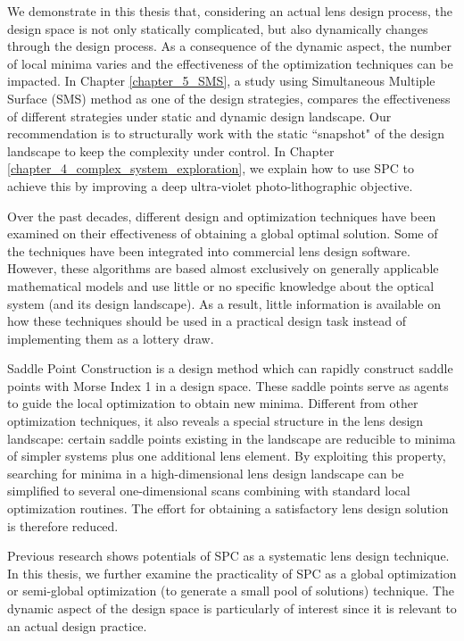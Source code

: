 We demonstrate in this thesis that, considering an actual lens design process, the design space is not only statically complicated, but also dynamically changes through the design process. As a consequence of the dynamic aspect, the number of local minima varies and the effectiveness of the optimization techniques can be impacted. In Chapter \ref{chapter_5_SMS}, a study using Simultaneous Multiple Surface (SMS) method as one of the design strategies, compares the effectiveness of different strategies under static and dynamic design landscape. Our recommendation is to structurally work with the static “snapshot" of the design landscape to keep the complexity under control. In Chapter \ref{chapter_4_complex_system_exploration}, we explain how to use SPC to achieve this by improving a deep ultra-violet photo-lithographic objective.

Over the past decades, different design and optimization techniques have been examined on their effectiveness of obtaining a global optimal solution. Some of the techniques have been integrated into commercial lens design software. However, these algorithms are based almost exclusively on generally applicable mathematical models and use little or no specific knowledge about the optical system (and its design landscape). As a result, little information is available on how these techniques should be used in a practical design task instead of implementing them as a lottery draw. 

Saddle Point Construction is a design method which can rapidly construct saddle points with Morse Index 1 in a design space. These saddle points serve as agents to guide the local optimization to obtain new minima. Different from other optimization techniques, it also reveals a special structure in the lens design landscape: certain saddle points existing in the landscape are reducible to minima of simpler systems plus one additional lens element. By exploiting this property, searching for minima in a high-dimensional lens design landscape can be simplified to several one-dimensional scans combining with standard local optimization routines. The effort for obtaining a satisfactory lens design solution is therefore reduced.   

Previous research shows potentials of SPC as a systematic lens design technique. In this thesis, we further examine the practicality of SPC as a global optimization or semi-global optimization (to generate a small pool of solutions) technique. The dynamic aspect of the design space is particularly of interest since it is relevant to an actual design practice. 

